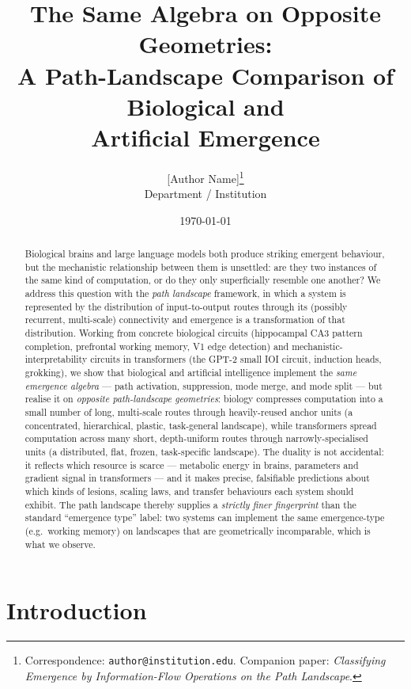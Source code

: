 \documentclass[11pt,a4paper]{article}
\title{\bfseries The Same Algebra on Opposite Geometries:\\
A Path-Landscape Comparison of Biological and\\
Artificial Emergence}
\author{[Author Name]\thanks{Correspondence: \texttt{author@institution.edu}.
Companion paper: \emph{Classifying Emergence by Information-Flow
Operations on the Path Landscape}.}\\
\small Department / Institution}
\date{\today}
\begin{document}
\maketitle

\begin{abstract}
\noindent
Biological brains and large language models both produce striking
emergent behaviour, but the mechanistic relationship between them is
unsettled: are they two instances of the same kind of computation, or
do they only superficially resemble one another? We address this
question with the \emph{path landscape} framework, in which a system
is represented by the distribution of input-to-output routes through
its (possibly recurrent, multi-scale) connectivity and emergence is a
transformation of that distribution. Working from concrete biological
circuits (hippocampal CA3 pattern completion, prefrontal working
memory, V1 edge detection) and mechanistic-interpretability circuits
in transformers (the GPT-2 small IOI circuit, induction heads,
grokking), we show that biological and artificial intelligence
implement the \emph{same emergence algebra} --- path activation,
suppression, mode merge, and mode split --- but realise it on
\emph{opposite path-landscape geometries}: biology compresses
computation into a small number of long, multi-scale routes through
heavily-reused anchor units (a concentrated, hierarchical, plastic,
task-general landscape), while transformers spread computation across
many short, depth-uniform routes through narrowly-specialised units (a
distributed, flat, frozen, task-specific landscape). The duality is
not accidental: it reflects which resource is scarce --- metabolic
energy in brains, parameters and gradient signal in transformers ---
and it makes precise, falsifiable predictions about which kinds of
lesions, scaling laws, and transfer behaviours each system should
exhibit. The path landscape thereby supplies a \emph{strictly finer
fingerprint} than the standard ``emergence type'' label: two systems
can implement the same emergence-type (e.g.\ working memory) on
landscapes that are geometrically incomparable, which is what we
observe.
\end{abstract}

\section{Introduction}
\end{document}
